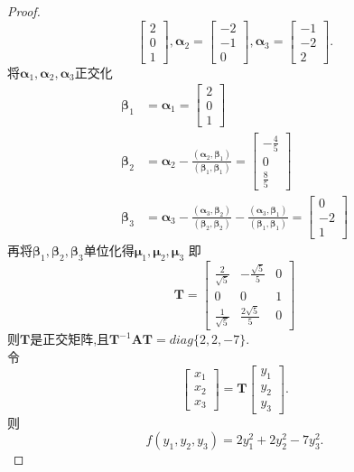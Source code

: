 \documentclass[lang=cn,11pt,normal]{elegantbook}
\begin{document}
\begin{proof}
$$		\begin{bmatrix}
		2\\0\\1
		\end{bmatrix},
		\boldsymbol{\alpha}_2=
		\begin{bmatrix}
		-2\\-1\\0
		\end{bmatrix},
		\boldsymbol{\alpha}_3=
		\begin{bmatrix}
		-1\\-2\\2
		\end{bmatrix}.
		$$
		将$\boldsymbol{\alpha}_1,\boldsymbol{\alpha}_2,\boldsymbol{\alpha}_3$正交化\\
		$$
		\begin{aligned}
		\boldsymbol{\beta}_1&=\boldsymbol{\alpha}_1=
		\begin{bmatrix}
		2\\0\\1
		\end{bmatrix}\\
		\boldsymbol{\beta}_2&=\boldsymbol{\alpha}_2-\frac{(\boldsymbol{\alpha}_2,\boldsymbol{\beta}_1)}{(\boldsymbol{\beta}_1,\boldsymbol{\beta}_1)}=
		\begin{bmatrix}
		-\frac{4}{5}\\0\\\frac{8}{5}
		\end{bmatrix}\\
		\boldsymbol{\beta}_3&=\boldsymbol{\alpha}_3-\frac{(\boldsymbol{\alpha}_3,\boldsymbol{\beta}_2)}{(\boldsymbol{\beta}_2,\boldsymbol{\beta}_2)}-\frac{(\boldsymbol{\alpha}_3,\boldsymbol{\beta}_1)}{(\boldsymbol{\beta}_1,\boldsymbol{\beta}_1)}=
		\begin{bmatrix}
		0\\-2\\1
		\end{bmatrix}
		\end{aligned}
		$$
		再将$\boldsymbol{\beta}_1,\boldsymbol{\beta}_2,\boldsymbol{\beta}_3$单位化得$\boldsymbol{\mu}_1,\boldsymbol{\mu}_2,\boldsymbol{\mu}_3$
		即
		$$
		\boldsymbol{T}=
		\begin{bmatrix}
		\frac{2}{\sqrt{5}}&-\frac{\sqrt{5}}{5}&0\\
		0&0&1\\
		\frac{1}{\sqrt{5}}&\frac{2\sqrt{5}}{5}&0
		\end{bmatrix}
		$$
		则$\boldsymbol{T}$是正交矩阵,且$\boldsymbol{T}^{-1}\boldsymbol{A}\boldsymbol{T}=diag\{2,2,-7\}$.\\
		令
		$$
		\begin{bmatrix}
		x_1\\x_2\\x_3
		\end{bmatrix}
		=
		\boldsymbol{T}
		\begin{bmatrix}
		y_1\\y_2\\y_3
		\end{bmatrix}.
		$$
		则\\
		$$f(y_1,y_2,y_3)=2y_1^2+2y_2^2-7y_3^2.$$
	\end{proof}
\end{document}
